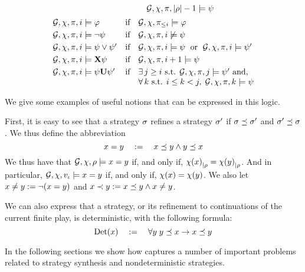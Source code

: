 \begin{definition}
\[\begin{array}{lcl}
  & &\quad   \CGS,\assign,\iplay,|\fplay|-1\modelsSL \psi\\[5pt]
    \CGS,\assign,\iplay,i\modelsSL \phi & \text{if} &
                                                         \CGS,\assign,\iplay_{\leq i}\modelsSL\phi\\[3pt]
   \CGS,\assign,\iplay,i\modelsSL \neg\psi & \text{if} &
  \CGS,\assign,\iplay,i\not\modelsSL\psi\\[3pt]
 \CGS,\assign,\iplay,i\modelsSL \psi\ou\psi' & \text{if} &
  \CGS,\assign,\iplay,i\modelsSL\psi \;\text{ or }\;
  \CGS,\assign,\iplay,i\modelsSL\psi' \\[3pt]
  \CGS,\assign,\iplay,i\modelsSL\X\psi & \text{if} &
  \CGS,\assign,\iplay,i+1\modelsSL\psi\\[3pt]
\CGS,\assign,\iplay,i\modelsSL\psi\until\psi' & \text{if} & \exists\, j\geq i
   \mbox{ s.t. }\CGS,\assign,\iplay,j\modelsSL \psi' \text{ and,}\\ 
   & & \forall\, k \text{ s.t. } i\leq k <j,
\; \CGS,\assign,\iplay,k\modelsSL \psi
\end{array}
\]
\end{definition}


We give some examples of useful notions that can be expressed in this
logic. 

\begin{example}
  First, it is easy to see that a strategy $\sigma$ refines a strategy
  $\sigma'$ if $\sigma \preceq \sigma'$ and
  $\sigma'\preceq\sigma$. We thus define the abbreviation
  \[x = y \quad := \quad x \preceq y \wedge y
    \preceq x\]
  We thus have that $\CGS,\assign,\fplay\models \var = \varb$ if, and
  only if, ${\chi(x)}_{|\rho}={\chi(y)}_{|\rho}$. And in
  particular, $\CGS,\assign,\pos_\init\models\var=\varb$ if, and only
  if, $\chi(x)=\chi(y)$.
  We also let $x \neq y := \neg (x = y)$ and
  $x\prec y := x \preceq y \wedge x \neq y$.
\end{example}

\begin{example}
  We can also express that a strategy, or its refinement to
  continuations of the current finite play, is deterministic, with the
  following formula:
  \[\text{Det}(x) \quad := \quad \forall y \; y \preceq x \to x\preceq y\]
\end{example}


In the following sections we  show how \SLref captures a number of
important problems related to strategy synthesis and nondeterministic strategies. 







